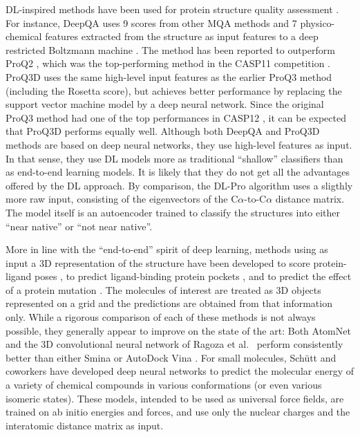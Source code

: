 DL-inspired methods have been used for protein structure quality
assessment \cite{nguyen2014dlpro, cao2016deepqa,
uziela2017proq3d}. For instance, DeepQA \cite{cao2016deepqa} uses 9
scores from other MQA methods and 7 physico-chemical features
extracted from the structure as input features to a deep restricted
Boltzmann machine \cite{hinton2006fast}. The method has been
reported \cite{cao2016deepqa} to outperform ProQ2 \cite{ray2012proq2},
which was the top-performing method in the CASP11
competition \cite{kryshtafovych2015}.  ProQ3D \cite{uziela2017proq3d}
uses the same high-level input features as the earlier ProQ3
method \cite{uziela2016proq3} (including the
Rosetta \cite{leaverfay2011rosetta} score), but achieves better
performance by replacing the support vector machine model by a deep
neural network. Since the original ProQ3 method had one of the top
performances in CASP12 \cite{elofsson2017qacasp12}, it can be expected
that ProQ3D performs equally well. Although both DeepQA and ProQ3D
methods are based on deep neural networks, they use high-level
features as input. In that sense, they use DL models more as
traditional ``shallow'' classifiers than as end-to-end learning
models. It is likely that they do not get all the advantages offered
by the DL approach.
%
By comparison, the DL-Pro algorithm \cite{nguyen2014dlpro} uses a
sligthly more raw input, consisting of the eigenvectors of the
C$\alpha$-to-C$\alpha$ distance matrix. The model itself is an
autoencoder \cite{hinton2006reducing} trained to classify the
structures into either ``near native'' or ``not near native''.

More in line with the ``end-to-end'' spirit of deep learning, methods
using as input a 3D representation of the structure have been
developed to score protein-ligand poses \cite{wallach2015atomnet,
ragoza2017protein}, to predict ligand-binding protein
pockets \cite{jimenez2017deepsite}, and to predict the effect of a
protein mutation \cite{torng2017}. The molecules of interest are
treated as 3D objects represented on a grid and the predictions are
obtained from that information only. While a rigorous comparison of
each of these methods is not always possible, they generally appear to
improve on the state of the art: Both
AtomNet \cite{wallach2015atomnet} and the 3D convolutional neural
network of Ragoza et al.\ \cite{ragoza2017protein} perform
consistently better than either Smina \cite{koes2013smina} or AutoDock
Vina \cite{trott2009vina}.
%
For small molecules, Sch\"{u}tt and coworkers \cite{schutt2017quantum,
schutt2017moleculenet} have developed deep neural networks to predict
the molecular energy of a variety of chemical compounds in various
conformations (or even various isomeric states). These models,
intended to be used as universal force fields, are trained on ab
initio energies and forces, and use only the nuclear charges and the
interatomic distance matrix as input.
